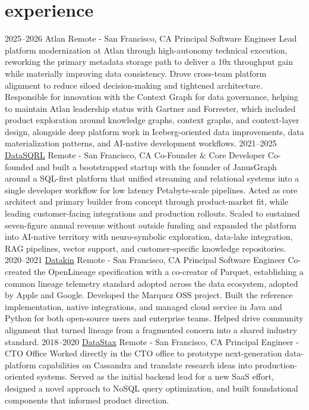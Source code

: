 \documentclass[]{friggeri-cv} %
\begin{document}
\section{experience}
\begin{entrylist}
\entry
{2025--2026}
{Atlan}
{Remote - San Francisco, CA}
{Principal Software Engineer}
{
	Lead platform modernization at Atlan through high-autonomy technical execution, reworking the primary metadata storage path to deliver a 10x throughput gain while materially improving data consistency. Drove cross-team platform alignment to reduce siloed decision-making and tightened architecture. Responsible for innovation with the Context Graph for data governance, helping to maintain Atlan leadership status with Gartner and Forrester, which included product exploration around knowledge graphs, context graphs, and context-layer design, alongside deep platform work in Iceberg-oriented data improvements, data materialization patterns, and AI-native development workflows.
}
\entry
{2021--2025}
{\href{https://datasqrl.com/}{DataSQRL}}
{Remote - San Francisco, CA}
{Co-Founder \& Core Developer}
{
	Co-founded and built a bootstrapped startup with the founder of JanusGraph around a SQL-first platform that unified streaming and relational systems into a single developer workflow for low latency Petabyte-scale pipelines. Acted as core architect and primary builder from concept through product-market fit, while leading customer-facing integrations and production rollouts. Scaled to sustained seven-figure annual revenue without outside funding and expanded the platform into AI-native territory with neuro-symbolic exploration, data-lake integration, RAG pipelines, vector support, and customer-specific knowledge repositories.
}
\entry
{2020--2021}
{\href{https://openlineage.io/}{Datakin}}
{Remote - San Francisco, CA}
{Principal Software Engineer}
{
	Co-created the OpenLineage specification with a co-creator of Parquet, establishing a common lineage telemetry standard adopted across the data ecosystem, adopted by Apple and Google. Developed the Marquez OSS project. Built the reference implementation, native integrations, and managed cloud service in Java and Python for both open-source users and enterprise teams. Helped drive community alignment that turned lineage from a fragmented concern into a shared industry standard.
}
\entry
{2018--2020}
{\href{https://www.datastax.com/}{DataStax}}
{Remote - San Francisco, CA}
{Principal Engineer - CTO Office}
{
	Worked directly in the CTO office to prototype next-generation data-platform capabilities on Cassandra and translate research ideas into production-oriented systems. Served as the initial backend lead for a new SaaS effort, designed a novel approach to NoSQL query optimization, and built foundational components that informed product direction.
}
\end{entrylist}
\end{document}
